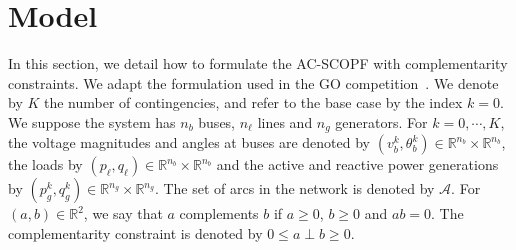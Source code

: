 \documentclass{IEEEtran4PSCC}
\newcommand{\add}[1]{#1}
\begin{document}
\section{Model}
In this section, we detail how to formulate the AC-SCOPF with complementarity constraints.
We adapt the formulation used in the GO competition~\cite{aravena2023recent}.
We denote by $K$ the number of contingencies, and refer to the base case by the index $k=0$.
We suppose the system has $n_b$ buses, $n_\ell$ lines and $n_g$ generators.
For $k=0, \cdots, K$, the voltage magnitudes and angles at buses are denoted by
$(v_b^k, \theta_b^k) \in \mathbb{R}^{n_b} \times \mathbb{R}^{n_b}$,
\add{the loads by $(p_{\ell}, q_\ell) \in \mathbb{R}^{n_b} \times \mathbb{R}^{n_b}$ and the active and reactive power generations by $(p_g^k, q_g^k) \in \mathbb{R}^{n_g} \times \mathbb{R}^{n_g}$.
The set of arcs in the network is denoted by $\mathcal{A}$.}
For $(a, b) \in \mathbb{R}^2$, we say that $a$ complements $b$ if $a \geq 0$, $b \geq 0$
and $a b = 0$. The complementarity constraint is denoted by $0 \leq a \perp b \geq 0$.
\end{document}
